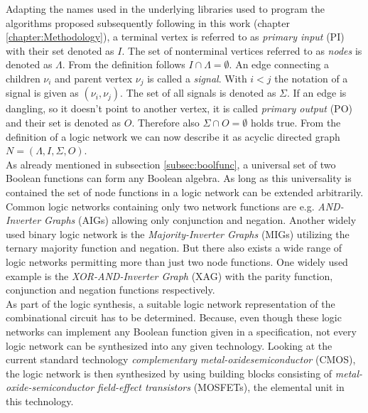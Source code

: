 Adapting the names used in the underlying libraries used to program the algorithms proposed subsequently following in this work (chapter \ref{chapter:Methodology}), a terminal vertex is referred to as \textit{primary input} (PI) with their set denoted as $I$. The set of nonterminal vertices referred to as \textit{nodes} is denoted as $\Lambda$. From the definition follows $I \cap \Lambda = \emptyset$. An edge connecting a children $\nu_i$ and parent vertex $\nu_j$ is called a \textit{signal}. With $i < j$ the notation of a signal is given as $(\nu_i, \nu_j)$. The set of all signals is denoted as $\Sigma$. If an edge is dangling, so it doesn't point to another vertex, it is called \textit{primary output} (PO) and their set is denoted as $O$. Therefore also $\Sigma \cap O = \emptyset$ holds true. From the definition of a logic network we can now describe it as acyclic directed graph $N = (\Lambda, I, \Sigma, O)$.\\
As already mentioned in subsection \ref{subsec:boolfunc}, a universal set of two Boolean functions can form any Boolean algebra.
As long as this universality is contained the set of node functions in a logic network can be extended arbitrarily. Common logic networks containing only two network functions are e.g. \textit{AND-Inverter Graphs} (AIGs) allowing only conjunction and negation. Another widely used binary logic network is the \textit{Majority-Inverter Graphs} (MIGs) utilizing the ternary majority function and negation. But there also exists a wide range of logic networks permitting more than just two node functions. One widely used example is the \textit{XOR-AND-Inverter Graph} (XAG) with the parity function, conjunction and negation functions respectively.\\

As part of the logic synthesis, a suitable logic network representation of the combinational circuit has to be determined. Because, even though these logic networks can implement any Boolean function given in a specification, not every logic network can be synthesized into any given technology.
Looking at the current standard technology \textit{complementary metal-oxidesemiconductor} (CMOS), the logic network is then synthesized by using building blocks consisting of \textit{metal-oxide-semiconductor field-effect transistors} (MOSFETs), the elemental unit in this technology.\\

